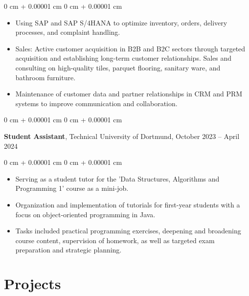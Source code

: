 \documentclass[10pt, letterpaper]{article}
\newenvironment{highlights}{
    \begin{itemize}[
        topsep=0.10 cm,
        parsep=0.10 cm,
        partopsep=0pt,
        itemsep=0pt,
        leftmargin=0 cm + 10pt
    ]
}{
    \end{itemize}
} %
\newenvironment{onecolentry}{
    \begin{adjustwidth}{
        0 cm + 0.00001 cm
    }{
        0 cm + 0.00001 cm
    }
}{
    \end{adjustwidth}
} %
\newenvironment{twocolentry}[2][]{
    \onecolentry
    \def\secondColumn{#2}
    \setcolumnwidth{\fill, 4.5 cm}
    \begin{paracol}{2}
}{
    \switchcolumn \raggedleft \secondColumn
    \end{paracol}
    \endonecolentry
} %
\begin{document}
        \vspace{0.10 cm}
        \begin{onecolentry}
            \begin{highlights}
                \item Using SAP and SAP S/4HANA to optimize inventory, orders, delivery processes, and complaint handling.

               \item Sales: Active customer acquisition in B2B and B2C sectors through targeted acquisition and establishing long-term customer relationships. Sales and consulting on high-quality tiles, parquet flooring, sanitary ware, and bathroom furniture.

                \item Maintenance of customer data and partner relationships in CRM and PRM systems to improve communication and collaboration.
            \end{highlights}
        \end{onecolentry}

        \vspace{1 cm}
 
        \begin{twocolentry}{
            October 2023 – April 2024
        }
            \textbf{Student Assistant}, Technical University of Dortmund, \end{twocolentry}

       \vspace{0.10 cm}
\begin{onecolentry}
    \begin{highlights}
        \item Serving as a student tutor for the 'Data Structures, Algorithms and Programming 1' course as a mini-job.
        \item Organization and implementation of tutorials for first-year students with a focus on object-oriented programming in Java.
        \item Tasks included practical programming exercises, deepening and broadening course content, supervision of homework, as well as targeted exam preparation and strategic planning.
    \end{highlights}
\end{onecolentry}
    
\section{Projects}
\end{document}
